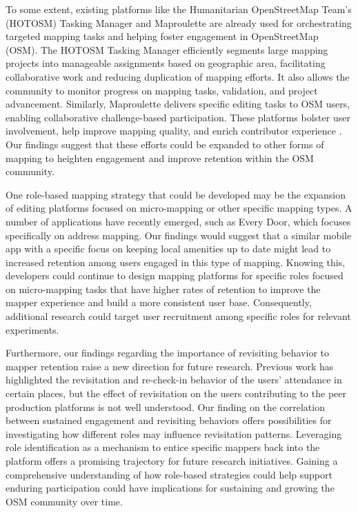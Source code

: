 \documentclass[manuscript,screen,review]{acmart}
\begin{document}
To some extent, existing platforms like the Humanitarian OpenStreetMap Team's (HOTOSM) Tasking Manager \cite{hot_task_manager} and Maproulette \cite{maproulette} are already used for orchestrating targeted mapping tasks and helping foster engagement in OpenStreetMap (OSM). The HOTOSM Tasking Manager efficiently segments large mapping projects into manageable assignments based on geographic area, facilitating collaborative work and reducing duplication of mapping efforts. It also allows the community to monitor progress on mapping tasks, validation, and project advancement. Similarly, Maproulette delivers specific editing tasks to OSM users, enabling collaborative challenge-based participation. These platforms bolster user involvement, help improve mapping quality, and enrich contributor experience \cite{herfort2021evolution}. Our findings suggest that these efforts could be expanded to other forms of mapping to heighten engagement and improve retention within the OSM community.

One role-based mapping strategy that could be developed may be the expansion of editing platforms focused on micro-mapping or other specific mapping types. A number of applications have recently emerged, such as Every Door\cite{Every_door}, which focuses specifically on address mapping. Our findings would suggest that a similar mobile app with a specific focus on keeping local amenities up to date might lead to increased retention among users engaged in this type of mapping. Knowing this, developers could continue to design mapping platforms for specific roles focused on micro-mapping tasks that have higher rates of retention to improve the mapper experience and build a more consistent user base. Consequently, additional research could target user recruitment among specific roles for relevant experiments. 

Furthermore, our findings regarding the importance of revisiting behavior to mapper retention raise a new direction for future research. Previous work \cite{Chen20} has highlighted the revisitation and re-check-in behavior of the users' attendance in certain places, but the effect of revisitation on the users contributing to the peer production platforms is not well understood. Our finding on the correlation between sustained engagement and revisiting behaviors offers possibilities for investigating how different roles may influence revisitation patterns. Leveraging role identification as a mechanism to entice specific mappers back into the platform offers a promising trajectory for future research initiatives. Gaining a comprehensive understanding of how role-based strategies could help support enduring participation could have implications for sustaining and growing the OSM community over time.
\end{document}
